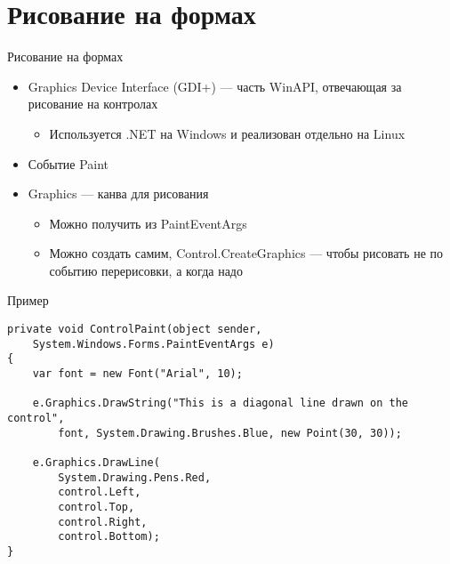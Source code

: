 \documentclass{../../slides-style}
\begin{document}
    \begin{frame}[plain]
        \titlepage
    \end{frame}

    \section{Рисование на формах}

    \begin{frame}{Рисование на формах}
        \begin{itemize}
            \item Graphics Device Interface (GDI+) --- часть WinAPI, отвечающая за рисование на контролах
            \begin{itemize}
                \item Используется .NET на Windows и реализован отдельно на Linux
            \end{itemize}
            \item Событие Paint
            \item Graphics --- канва для рисования
            \begin{itemize}
                \item Можно получить из PaintEventArgs
                \item Можно создать самим, Control.CreateGraphics --- чтобы рисовать не по событию перерисовки, а когда надо
            \end{itemize}
        \end{itemize}
    \end{frame}

    \begin{frame}[fragile]{Пример}
        \begin{verbatim}
private void ControlPaint(object sender, 
    System.Windows.Forms.PaintEventArgs e)
{
    var font = new Font("Arial", 10);

    e.Graphics.DrawString("This is a diagonal line drawn on the control",
        font, System.Drawing.Brushes.Blue, new Point(30, 30));

    e.Graphics.DrawLine(
        System.Drawing.Pens.Red,
        control.Left,
        control.Top,
        control.Right,
        control.Bottom);
}
        \end{verbatim}
    \end{frame}
\end{document}
